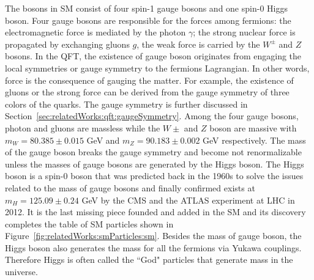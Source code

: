The bosons in SM consist of four spin-1 gauge bosons and one spin-0 Higgs boson. Four gauge bosons are responsible for the forces among fermions: the electromagnetic force is mediated by the photon $\gamma$; the strong nuclear force is propagated by exchanging gluons $g$, the weak force is carried by the $W^\pm$ and $Z$ bosons. In the QFT, the existence of gauge boson originates from engaging the local symmetries or gauge symmetry to the fermions Lagrangian. In other words, force is the consequence of gauging the matter. For example, the existence of gluons or the strong force can be derived from the gauge symmetry of three colors of the quarks. The gauge symmetry is further discussed in Section~\ref{sec:relatedWorks:qft:gaugeSymmetry}. Among the four gauge bosons, photon and gluons are massless while the $W\pm$ and $Z$ boson are massive with $m_W = 80.385\pm0.015$ GeV and $m_Z = 90.183\pm 0.002$ GeV \cite{pdg2020} respectively. The mass of the gauge boson breaks the gauge symmetry and become not renormalizable unless the masses of gauge bosons are generated by the Higgs boson. The Higgs boson is a spin-0 boson that was predicted back in the 1960s to solve the issues related to the mass of gauge bosons and finally confirmed exists at $m_H=125.09\pm 0.24$ GeV by the CMS \cite{Chatrchyan:2012ufa} and the ATLAS \cite{Aad:2012tfa} experiment at LHC in 2012. It is the last missing piece founded and added in the SM and its discovery completes the table of SM particles shown in Figure~\ref{fig:relatedWorks:smParticles:sm}. Besides the mass of gauge boson, the Higgs boson also generates the mass for all the fermions via Yukawa couplings. Therefore Higgs is often called the ``God" particles that generate mass in the universe.

